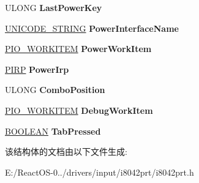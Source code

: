 \begin{DoxyCompactItemize}
U\+L\+O\+NG {\bfseries Last\+Power\+Key}
\item 
\mbox{\label{struct___i8042___k_e_y_b_o_a_r_d___e_x_t_e_n_s_i_o_n_aad3fc3dbc1909f9dba0979f0803629df}} 
\hyperlink{struct___u_n_i_c_o_d_e___s_t_r_i_n_g}{U\+N\+I\+C\+O\+D\+E\+\_\+\+S\+T\+R\+I\+NG} {\bfseries Power\+Interface\+Name}
\item 
\mbox{\label{struct___i8042___k_e_y_b_o_a_r_d___e_x_t_e_n_s_i_o_n_ae01b8a333765c865386e82a1d87eb745}} 
\hyperlink{struct___i_o___w_o_r_k_i_t_e_m}{P\+I\+O\+\_\+\+W\+O\+R\+K\+I\+T\+EM} {\bfseries Power\+Work\+Item}
\item 
\mbox{\label{struct___i8042___k_e_y_b_o_a_r_d___e_x_t_e_n_s_i_o_n_a3a439da6f1cc59ef734c7b9f9b8c0490}} 
\hyperlink{interfacevoid}{P\+I\+RP} {\bfseries Power\+Irp}
\item 
\mbox{\label{struct___i8042___k_e_y_b_o_a_r_d___e_x_t_e_n_s_i_o_n_acc5ab3ff1891a77be986e80d9584280a}} 
U\+L\+O\+NG {\bfseries Combo\+Position}
\item 
\mbox{\label{struct___i8042___k_e_y_b_o_a_r_d___e_x_t_e_n_s_i_o_n_a30de9d92a320e901c374f7c3d5c19057}} 
\hyperlink{struct___i_o___w_o_r_k_i_t_e_m}{P\+I\+O\+\_\+\+W\+O\+R\+K\+I\+T\+EM} {\bfseries Debug\+Work\+Item}
\item 
\mbox{\label{struct___i8042___k_e_y_b_o_a_r_d___e_x_t_e_n_s_i_o_n_aeb5887ea9156224bc8009758e4517dfc}} 
\hyperlink{_processor_bind_8h_a112e3146cb38b6ee95e64d85842e380a}{B\+O\+O\+L\+E\+AN} {\bfseries Tab\+Pressed}
\end{DoxyCompactItemize}


该结构体的文档由以下文件生成\+:\begin{DoxyCompactItemize}
\item 
E\+:/\+React\+O\+S-\/0../drivers/input/i8042prt/i8042prt.\+h\end{DoxyCompactItemize}
